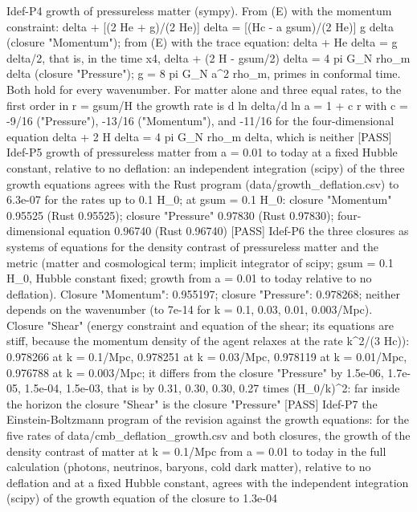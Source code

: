 \documentclass[
  10pt,
]{article}
\newenvironment{Shaded}{}{}
\newcommand{\NormalTok}[1]{#1}
\begin{document}
\begin{Shaded}
\begin{Highlighting}[]
\NormalTok{[PASS] Idef{-}P4  growth of pressureless matter (sympy). From (E) with the momentum constraint: delta\textquotesingle{}\textquotesingle{} + [(2 He\textquotesingle{} + g)/(2 He)] delta\textquotesingle{} = [(Hc {-} a gsum)/(2 He)] g delta (closure "Momentum"); from (E) with the trace equation: delta\textquotesingle{}\textquotesingle{} + He delta\textquotesingle{} = g delta/2, that is, in the time x4, delta\textquotesingle{}\textquotesingle{} + (2 H {-} gsum/2) delta\textquotesingle{} = 4 pi G\_N rho\_m delta (closure "Pressure"); g = 8 pi G\_N a\^{}2 rho\_m, primes in conformal time. Both hold for every wavenumber. For matter alone and three equal rates, to the first order in r = gsum/H the growth rate is d ln delta/d ln a = 1 + c r with c = {-}9/16 ("Pressure"), {-}13/16 ("Momentum"), and {-}11/16 for the four{-}dimensional equation delta\textquotesingle{}\textquotesingle{} + 2 H delta\textquotesingle{} = 4 pi G\_N rho\_m delta, which is neither}
\NormalTok{[PASS] Idef{-}P5  growth of pressureless matter from a = 0.01 to today at a fixed Hubble constant, relative to no deflation: an independent integration (scipy) of the three growth equations agrees with the Rust program (data/growth\_deflation.csv) to 6.3e{-}07 for the rates up to 0.1 H\_0; at gsum = 0.1 H\_0: closure "Momentum" 0.95525 (Rust 0.95525); closure "Pressure" 0.97830 (Rust 0.97830); four{-}dimensional equation 0.96740 (Rust 0.96740)}
\NormalTok{[PASS] Idef{-}P6  the three closures as systems of equations for the density contrast of pressureless matter and the metric (matter and cosmological term; implicit integrator of scipy; gsum = 0.1 H\_0, Hubble constant fixed; growth from a = 0.01 to today relative to no deflation). Closure "Momentum": 0.955197; closure "Pressure": 0.978268; neither depends on the wavenumber (to 7e{-}14 for k = 0.1, 0.03, 0.01, 0.003/Mpc). Closure "Shear" (energy constraint and equation of the shear; its equations are stiff, because the momentum density of the agent relaxes at the rate k\^{}2/(3 Hc)): 0.978266 at k = 0.1/Mpc, 0.978251 at k = 0.03/Mpc, 0.978119 at k = 0.01/Mpc, 0.976788 at k = 0.003/Mpc; it differs from the closure "Pressure" by 1.5e{-}06, 1.7e{-}05, 1.5e{-}04, 1.5e{-}03, that is by 0.31, 0.30, 0.30, 0.27 times (H\_0/k)\^{}2: far inside the horizon the closure "Shear" is the closure "Pressure"}
\NormalTok{[PASS] Idef{-}P7  the Einstein{-}Boltzmann program of the revision against the growth equations: for the five rates of data/cmb\_deflation\_growth.csv and both closures, the growth of the density contrast of matter at k = 0.1/Mpc from a = 0.01 to today in the full calculation (photons, neutrinos, baryons, cold dark matter), relative to no deflation and at a fixed Hubble constant, agrees with the independent integration (scipy) of the growth equation of the closure to 1.3e{-}04}

\end{Highlighting}
\end{Shaded}
\end{document}
